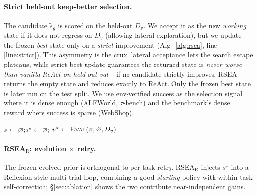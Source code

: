 \documentclass{article}
\begin{document}
\paragraph{Strict held-out keep-better selection.} The candidate $\tilde s_g$ is
scored on the held-out $D_v$. We accept it as the new \emph{working} state if it does
not regress on $D_v$ (allowing lateral exploration), but we update the frozen
\emph{best} state only on a \emph{strict} improvement (Alg.~\ref{alg:rsea}, line
\ref{line:strict}). This asymmetry is the crux: lateral acceptance lets the search
escape plateaus, while strict best-update guarantees the returned state is
\emph{never worse than vanilla ReAct on held-out val} -- if no candidate strictly
improves, RSEA returns the empty state and reduces exactly to ReAct. Only the frozen
best state is later run on the test split. We use env-verified success as the
selection signal where it is dense enough (ALFWorld, $\tau$-bench) and the
benchmark's dense reward where success is sparse (WebShop).

\begin{algorithm}[t]
\SetAlgoLined\DontPrintSemicolon
\footnotesize
{}
$s \leftarrow \varnothing$;\quad $s^\star \leftarrow \varnothing$;\quad
$v^\star \leftarrow \textsc{Eval}(\pi, \varnothing, D_v)$ 
 
\caption{RSEA evolution (strict held-out keep-better).}
\label{alg:rsea}
\end{algorithm}

\paragraph{RSEA$_\text{R}$: evolution {\boldmath$\times$} retry.} The frozen evolved
prior is orthogonal to per-task retry. RSEA$_\text{R}$ injects $s^\star$ into a
Reflexion-style multi-trial loop, combining a good \emph{starting} policy with
within-task self-correction; \S\ref{sec:ablation} shows the two contribute
near-independent gains.
\end{document}
